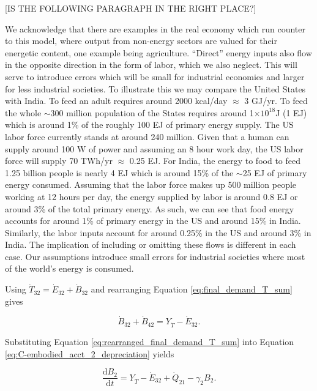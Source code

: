 [IS THE FOLLOWING PARAGRAPH IN THE RIGHT PLACE?]

We acknowledge that there are examples in the real economy which run counter to this model, where output from non-energy sectors are valued for their energetic content, one example being agriculture.  ``Direct'' energy inputs also flow in the opposite direction in the form of labor, which we also neglect. This will serve to introduce errors which will be small for industrial economies and larger for less industrial societies. To illustrate this we may compare the United States with India. To feed an adult requires around 2000 kcal/day $\approx$ 3 GJ/yr. To feed the whole $\sim$300 million population of the States requires around 1$\times 10^{18}$J (1 EJ) which is around 1\% of the roughly 100 EJ of primary energy supply. The US labor force currently stands at around 240 million. Given that a human can supply around 100 W of power and assuming an 8 hour work day, the US labor force will supply 70 TWh/yr $\approx$ 0.25 EJ. For India, the energy to food to feed 1.25 billion people is nearly 4 EJ which is around 15\% of the $\sim$25 EJ of primary energy consumed. Assuming that the labor force makes up 500 million people working at 12 hours per day, the energy supplied by labor is around 0.8 EJ or around 3\% of the total primary energy. As such, we can see that food energy accounts for around 1\% of primary energy in the US and around 15\% in India. Similarly, the labor inputs account for around 0.25\% in the US and around 3\% in India. The implication of including or omitting these flows is different in each case. Our assumptions introduce small errors for industrial societies where most of the world's energy is consumed.

Using $\dot{T}_{32} = \dot{E}_{32} + \dot{B}_{32}$ and rearranging Equation \ref{eq:final_demand_T_sum} gives

\begin{equation} \label{eq:rearranged_final_demand_T_sum}
	\dot{B}_{32} + \dot{B}_{42} = Y_{\dot{T}} - \dot{E}_{32}.
\end{equation}

\noindent Substituting Equation \ref{eq:rearranged_final_demand_T_sum} into Equation \ref{eq:C-embodied_acct_2_depreciation} yields

\begin{equation} \label{eq:intermediate_T_sum_dB2_dt}
	\frac{\mathrm{d}B_2}{\mathrm{d}t} = Y_{\dot{T}} - \dot{E}_{32} + \dot{Q}_{21} - \gamma_2 B_2.
\end{equation}

